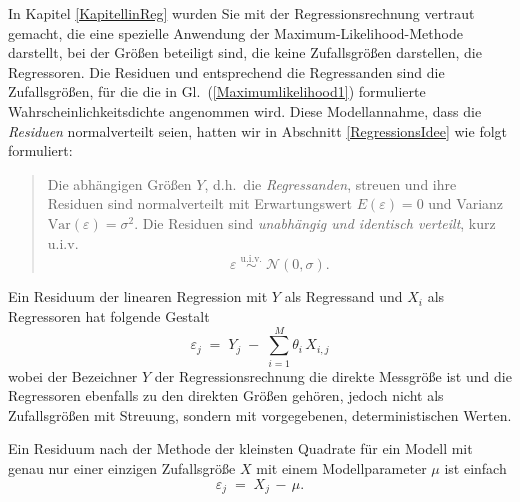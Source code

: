 In Kapitel \ref{KapitellinReg} wurden Sie mit der Regressionsrechnung vertraut gemacht, die
eine spezielle Anwendung der Maximum-Likelihood-Methode darstellt, bei der
Größen beteiligt sind, die keine Zufallsgrößen darstellen, die Regressoren.
Die Residuen und entsprechend die Regressanden sind die Zufallsgrößen,
für die die in Gl.~(\ref{Maximumlikelihood1}) formulierte Wahrscheinlichkeitsdichte
angenommen wird.
Diese Modellannahme, dass die \textsl{Residuen} normalverteilt seien,
hatten wir in Abschnitt \ref{RegressionsIdee} wie folgt formuliert:
\begin{quote}
Die abhängigen Größen $Y$, d.h.\ die \textsl{Regressanden}, streuen und ihre Residuen sind
	normalverteilt mit Erwartungswert $E(\varepsilon) = 0$ und Varianz $\mathrm{Var}(\varepsilon) = \sigma^2$.
	Die Residuen sind \textsl{unabhängig und identisch verteilt}, kurz u.i.v.
	\begin{equation}
	\varepsilon \; \overset{\mathrm{u.i.v.}}{\sim} \; \mathcal{N}(0,\sigma) .
	\end{equation}
\end{quote}
Ein Residuum der linearen Regression mit $Y$ als Regressand und $X_i$ als Regressoren
hat folgende Gestalt
\begin{equation}
\varepsilon_j \; = \; Y_j \; - \; \sum\limits_{i=1}^{M} \theta_i \, X_{i,j}
\end{equation}
wobei der Bezeichner $Y$ der Regressionsrechnung die direkte Messgröße ist und die
Regressoren ebenfalls zu den direkten Größen gehören, jedoch nicht als Zufallsgrößen mit
Streuung, sondern mit vorgegebenen, deterministischen Werten.

Ein Residuum nach der Methode der kleinsten Quadrate für ein Modell mit genau nur einer
einzigen Zufallsgröße $X$ mit einem Modellparameter $\mu$ ist einfach
\begin{equation}
\varepsilon_j \; = \; X_j \, - \, \mu .
\label{oneQuantityOnly1}
\end{equation}

